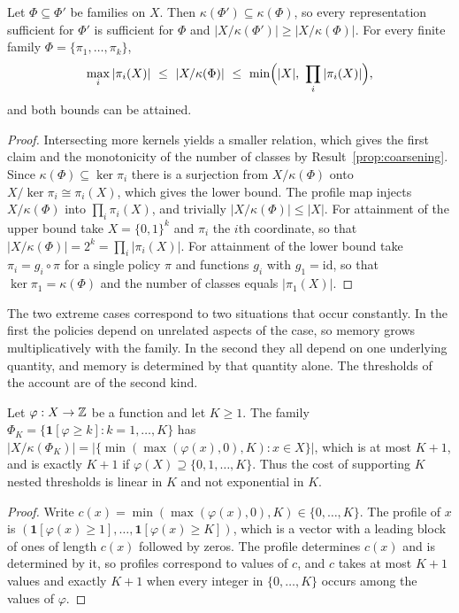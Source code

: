 \begin{established}\label{prop:family-bounds}
Let $\Phi\subseteq\Phi'$ be families on $X$. Then $\kappa(\Phi')\subseteq\kappa(\Phi)$, so every representation sufficient for $\Phi'$ is sufficient for $\Phi$ and $|X/\kappa(\Phi')|\ge|X/\kappa(\Phi)|$. For every finite family $\Phi=\{\pi_1,\dots,\pi_k\}$,
\[
\max_i|\pi_i(X)|\ \le\ |X/\kappa(\Phi)|\ \le\ \min\Bigl(|X|,\ \prod_{i}|\pi_i(X)|\Bigr),
\]
and both bounds can be attained.
\end{established}
\begin{proof}
Intersecting more kernels yields a smaller relation, which gives the first claim and the monotonicity of the number of classes by Result~\ref{prop:coarsening}. Since $\kappa(\Phi)\subseteq\ker\pi_i$ there is a surjection from $X/\kappa(\Phi)$ onto $X/{\ker\pi_i}\cong\pi_i(X)$, which gives the lower bound. The profile map injects $X/\kappa(\Phi)$ into $\prod_i\pi_i(X)$, and trivially $|X/\kappa(\Phi)|\le|X|$. For attainment of the upper bound take $X=\{0,1\}^{k}$ and $\pi_i$ the $i$th coordinate, so that $|X/\kappa(\Phi)|=2^{k}=\prod_i|\pi_i(X)|$. For attainment of the lower bound take $\pi_i=g_i\circ\pi$ for a single policy $\pi$ and functions $g_i$ with $g_1=\mathrm{id}$, so that $\ker\pi_1=\kappa(\Phi)$ and the number of classes equals $|\pi_1(X)|$.
\end{proof}

The two extreme cases correspond to two situations that occur constantly. In the first the policies depend on unrelated aspects of the case, so memory grows multiplicatively with the family. In the second they all depend on one underlying quantity, and memory is determined by that quantity alone. The thresholds of the account are of the second kind.

\begin{newresult}\label{prop:chain}
Let $\varphi:X\to\mathbb{Z}$ be a function and let $K\ge1$. The family $\Phi_K=\{\mathbf 1[\varphi\ge k]:k=1,\dots,K\}$ has $|X/\kappa(\Phi_K)|=|\{\min(\max(\varphi(x),0),K):x\in X\}|$, which is at most $K+1$, and is exactly $K+1$ if $\varphi(X)\supseteq\{0,1,\dots,K\}$. Thus the cost of supporting $K$ nested thresholds is linear in $K$ and not exponential in $K$.
\end{newresult}
\begin{proof}
Write $c(x)=\min(\max(\varphi(x),0),K)\in\{0,\dots,K\}$. The profile of $x$ is $(\mathbf 1[\varphi(x)\ge1],\dots,\mathbf 1[\varphi(x)\ge K])$, which is a vector with a leading block of ones of length $c(x)$ followed by zeros. The profile determines $c(x)$ and is determined by it, so profiles correspond to values of $c$, and $c$ takes at most $K+1$ values and exactly $K+1$ when every integer in $\{0,\dots,K\}$ occurs among the values of $\varphi$.
\end{proof}

